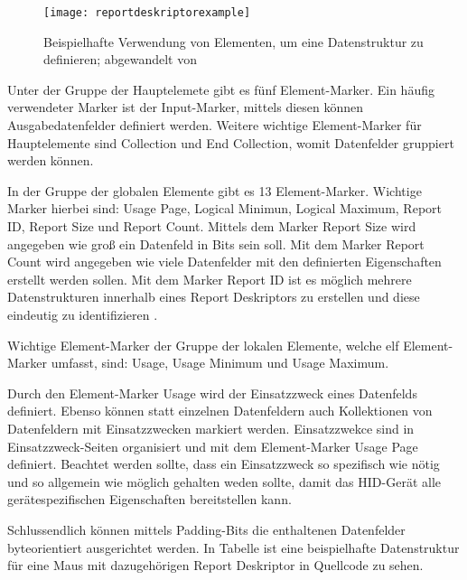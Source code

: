 \begin{figure}[h]
    \centering
    \texttt{[image: reportdeskriptorexample]}
    \caption{Beispielhafte Verwendung von Elementen, um eine Datenstruktur zu definieren; abgewandelt von \cite[S.~24]{usbHIDS}}
    \label{fig:reportdeskriptorexample}
\end{figure}

Unter der Gruppe der Hauptelemete gibt es fünf Element-Marker. Ein häufig verwendeter Marker ist der Input-Marker, mittels diesen können Ausgabedatenfelder definiert werden. Weitere wichtige Element-Marker für Hauptelemente sind Collection und End Collection, womit Datenfelder gruppiert werden können. \cite[S.~23f., S.~30ff.]{usbHIDS}

In der Gruppe der globalen Elemente gibt es 13 Element-Marker. Wichtige Marker hierbei sind: Usage Page, Logical Minimun, Logical Maximum, Report ID, Report Size und Report Count. Mittels dem Marker Report Size wird angegeben wie groß ein Datenfeld in Bits sein soll. Mit dem Marker Report Count wird angegeben wie viele Datenfelder mit den definierten Eigenschaften erstellt werden sollen. Mit dem Marker Report ID ist es möglich mehrere Datenstrukturen innerhalb eines Report Deskriptors zu erstellen und diese eindeutig zu identifizieren \cite[S.~17]{usbHIDS}. \cite[S.~35ff.]{usbHIDS}

Wichtige Element-Marker der Gruppe der lokalen Elemente, welche elf Element-Marker umfasst, sind: Usage, Usage Minimum und Usage Maximum. \cite[S.~40]{usbHIDS}

Durch den Element-Marker Usage wird der Einsatzzweck eines Datenfelds definiert. Ebenso können statt einzelnen Datenfeldern auch Kollektionen von Datenfeldern mit Einsatzzwecken markiert werden. Einsatzzwekce sind in Einsatzzweck-Seiten organisiert und mit dem Element-Marker Usage Page definiert. Beachtet werden sollte, dass ein Einsatzzweck so spezifisch wie nötig und so allgemein wie möglich gehalten weden sollte, damit das \acs{HID}-Gerät alle gerätespezifischen Eigenschaften bereitstellen kann. \cite[S.~15f.]{usbHIDt}

Schlussendlich können mittels Padding-Bits die enthaltenen Datenfelder byteorientiert ausgerichtet werden. In Tabelle  ist eine beispielhafte Datenstruktur für eine Maus mit dazugehörigen Report Deskriptor in Quellcode  zu sehen.



